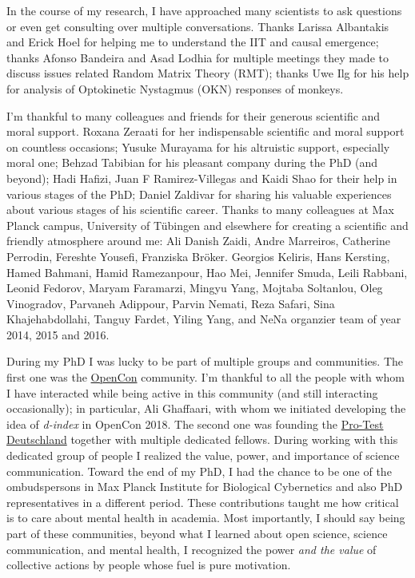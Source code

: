 In the course of my research, I have approached many scientists to ask questions or even get consulting over multiple conversations.
Thanks Larissa Albantakis and Erick Hoel for helping me to understand the IIT and causal emergence;
thanks Afonso Bandeira and Asad Lodhia for multiple meetings they made to discuss issues related Random Matrix Theory (RMT);
thanks Uwe Ilg for his help for analysis of Optokinetic Nystagmus (OKN) responses of monkeys.

I'm thankful to many colleagues and friends for their generous scientific and moral support.
Roxana Zeraati for her indispensable scientific and moral support on countless occasions;
Yusuke Murayama for his altruistic support, especially moral one;
Behzad Tabibian for his pleasant company during the PhD (and beyond);
Hadi Hafizi,
Juan F Ramirez-Villegas and Kaidi Shao for their help in various stages of the PhD;
Daniel Zaldivar for sharing his valuable experiences about various stages of his scientific career.
Thanks to many colleagues at Max Planck campus, University of T\"ubingen and elsewhere
for creating a scientific and friendly atmosphere around me:
Ali Danish Zaidi,
Andre Marreiros,
Catherine Perrodin,
Fereshte Yousefi,
Franziska Br\"oker.
Georgios Keliris,
Hans Kersting,
Hamed Bahmani,
Hamid Ramezanpour,
Hao Mei,
Jennifer Smuda, 
Leili Rabbani,
Leonid Fedorov,
Maryam Faramarzi,
Mingyu Yang,
Mojtaba Soltanlou,
Oleg Vinogradov,
Parvaneh Adippour,
Parvin Nemati,
Reza Safari,
Sina Khajehabdollahi,
Tanguy Fardet,
Yiling Yang,
and NeNa organzier team of year 2014, 2015 and 2016.

During my PhD I was lucky to be part of multiple groups and communities.
The first one was the \href{https://www.opencon.community/}{OpenCon} community.
I'm thankful to all the people with whom I have interacted while being active in this community
(and still interacting occasionally);
in particular, Ali Ghaffaari, with whom we initiated developing the idea of \emph{d-index} in OpenCon 2018.
The second one was
founding the \href{http://www.pro-test-deutschland.de/}{Pro-Test Deutschland} together with multiple dedicated fellows.
During working with this dedicated group of people I realized the value, power, and importance of science communication.
Toward the end of my PhD, I had the chance to be one of the ombudspersons in Max Planck Institute for Biological Cybernetics and also PhD representatives in a different period.
These contributions taught me how critical is to care about mental health in academia.
Most importantly, I should say being part of these communities, beyond what I learned about open science, science communication, and mental health,
I recognized the power \emph{and the value} of collective actions by people whose fuel is pure motivation.


